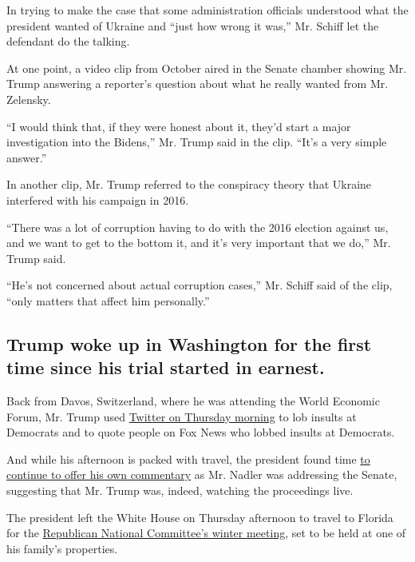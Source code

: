 In trying to make the case that some administration officials understood
what the president wanted of Ukraine and ``just how wrong it was,'' Mr.
Schiff let the defendant do the talking.

At one point, a video clip from October aired in the Senate chamber
showing Mr. Trump answering a reporter's question about what he really
wanted from Mr. Zelensky.

``I would think that, if they were honest about it, they'd start a major
investigation into the Bidens,'' Mr. Trump said in the clip. ``It's a
very simple answer.''

In another clip, Mr. Trump referred to the conspiracy theory that
Ukraine interfered with his campaign in 2016.

``There was a lot of corruption having to do with the 2016 election
against us, and we want to get to the bottom it, and it's very important
that we do,'' Mr. Trump said.

``He's not concerned about actual corruption cases,'' Mr. Schiff said of
the clip, ``only matters that affect him personally.''

\hypertarget{trump-woke-up-in-washington-for-the-first-time-since-his-trial-started-in-earnest}{%
\subsection{Trump woke up in Washington for the first time since his
trial started in
earnest.}\label{trump-woke-up-in-washington-for-the-first-time-since-his-trial-started-in-earnest}}

Back from Davos, Switzerland, where he was attending the World Economic
Forum, Mr. Trump used
\href{https://www.nytimes3xbfgragh.onion/live/2020/impeachment-trial-live-01-23/trump-back-in-washington-attacks-democrats-and-their-impeachment-arguments}{Twitter
on Thursday morning} to lob insults at Democrats and to quote people on
Fox News who lobbed insults at Democrats.

And while his afternoon is packed with travel, the president found time
\href{https://twitter.com/realDonaldTrump/status/1220410391668371457?ref_src=twsrc\%5Etfw\%7Ctwcamp\%5Etweetembed\&ref_url=https\%3A\%2F\%2Fd-28178312941550050575.ampproject.net\%2F2001071857360\%2Fframe.html}{to
continue to offer his own commentary} as Mr. Nadler was addressing the
Senate, suggesting that Mr. Trump was, indeed, watching the proceedings
live.

The president left the White House on Thursday afternoon to travel to
Florida for the
\href{https://www.nytimes3xbfgragh.onion/2019/11/14/us/politics/trump-doral-rnc.html}{Republican
National Committee's winter meeting}, set to be held at one of his
family's properties.

